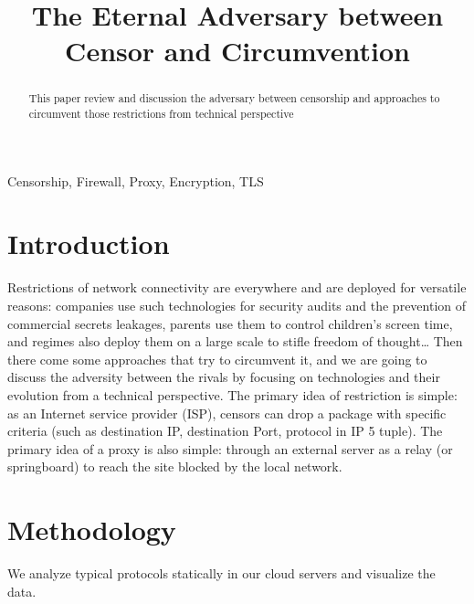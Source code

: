 \documentclass[conference]{IEEEtran}
\begin{document}
\title{The Eternal Adversary between Censor and Circumvention}
\footnotesize

\author{
}
\maketitle

\begin{abstract}
This paper review and discussion the adversary between censorship and approaches to circumvent those restrictions from technical perspective
\end{abstract}

\begin{IEEEkeywords}
Censorship, Firewall, Proxy, Encryption, TLS
\end{IEEEkeywords}

\section{Introduction}
Restrictions of network connectivity are everywhere and are deployed for versatile reasons: companies use such technologies for security audits and the prevention of commercial secrets leakages, parents use them to control children's screen time, and regimes also deploy them on a large scale to stifle freedom of thought… Then there come some approaches that try to circumvent it, and we are going to discuss the adversity between the rivals by focusing on technologies and their evolution from a technical perspective.
The primary idea of restriction is simple: as an Internet service provider (ISP), censors can drop a package with specific criteria (such as destination IP, destination Port, protocol in IP 5 tuple).
The primary idea of a proxy is also simple: through an external server as a relay (or springboard) to reach the site blocked by the local network.

\section{Methodology}
We analyze typical protocols statically in our cloud servers and visualize the data.
\end{document}
